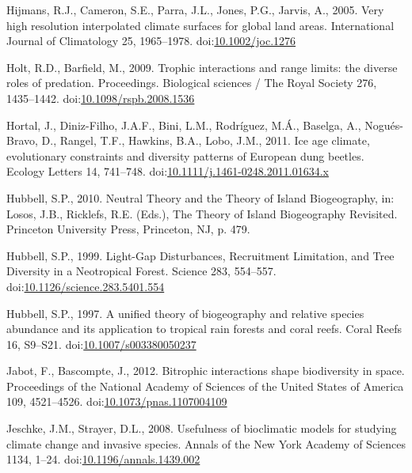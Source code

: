 \hypertarget{ref-Hijmans2005}{}
Hijmans, R.J., Cameron, S.E., Parra, J.L., Jones, P.G., Jarvis, A.,
2005. Very high resolution interpolated climate surfaces for global land
areas. International Journal of Climatology 25, 1965--1978.
doi:\href{https://doi.org/10.1002/joc.1276}{10.1002/joc.1276}

\hypertarget{ref-Holt2009}{}
Holt, R.D., Barfield, M., 2009. Trophic interactions and range limits:
the diverse roles of predation. Proceedings. Biological sciences / The
Royal Society 276, 1435--1442.
doi:\href{https://doi.org/10.1098/rspb.2008.1536}{10.1098/rspb.2008.1536}

\hypertarget{ref-Hortal2011}{}
Hortal, J., Diniz-Filho, J.A.F., Bini, L.M., Rodríguez, M.Á., Baselga,
A., Nogués-Bravo, D., Rangel, T.F., Hawkins, B.A., Lobo, J.M., 2011. Ice
age climate, evolutionary constraints and diversity patterns of European
dung beetles. Ecology Letters 14, 741--748.
doi:\href{https://doi.org/10.1111/j.1461-0248.2011.01634.x}{10.1111/j.1461-0248.2011.01634.x}

\hypertarget{ref-Hubbell2010}{}
Hubbell, S.P., 2010. Neutral Theory and the Theory of Island
Biogeography, in: Losos, J.B., Ricklefs, R.E. (Eds.), The Theory of
Island Biogeography Revisited. Princeton University Press, Princeton,
NJ, p. 479.

\hypertarget{ref-Hubbell1999}{}
Hubbell, S.P., 1999. Light-Gap Disturbances, Recruitment Limitation, and
Tree Diversity in a Neotropical Forest. Science 283, 554--557.
doi:\href{https://doi.org/10.1126/science.283.5401.554}{10.1126/science.283.5401.554}

\hypertarget{ref-Hubbell1997}{}
Hubbell, S.P., 1997. A unified theory of biogeography and relative
species abundance and its application to tropical rain forests and coral
reefs. Coral Reefs 16, S9--S21.
doi:\href{https://doi.org/10.1007/s003380050237}{10.1007/s003380050237}

\hypertarget{ref-Jabot2012}{}
Jabot, F., Bascompte, J., 2012. Bitrophic interactions shape
biodiversity in space. Proceedings of the National Academy of Sciences
of the United States of America 109, 4521--4526.
doi:\href{https://doi.org/10.1073/pnas.1107004109}{10.1073/pnas.1107004109}

\hypertarget{ref-Jeschke2008}{}
Jeschke, J.M., Strayer, D.L., 2008. Usefulness of bioclimatic models for
studying climate change and invasive species. Annals of the New York
Academy of Sciences 1134, 1--24.
doi:\href{https://doi.org/10.1196/annals.1439.002}{10.1196/annals.1439.002}

